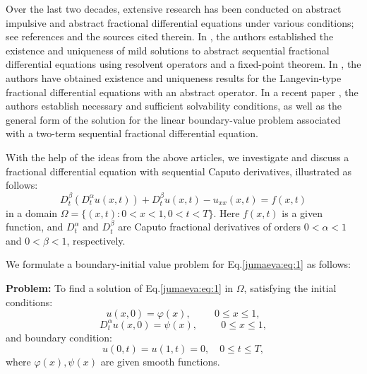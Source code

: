 \documentclass{amsart}
\numberwithin{equation}{section}
\begin{document}
Over the last two decades, extensive research has been conducted on abstract impulsive and abstract fractional differential equations under various conditions; see references \cite{jumaeva:ref:11, jumaeva:ref:12, jumaeva:ref:13, jumaeva:ref:14} and the sources cited therein.
In \cite{jumaeva:ref:11}, the authors established the existence and uniqueness of mild solutions to abstract sequential fractional differential equations using resolvent operators and a fixed-point theorem.
In \cite{jumaeva:ref:12, jumaeva:ref:13, jumaeva:ref:14}, the authors have obtained existence and uniqueness results for the Langevin-type fractional differential equations with an abstract operator.
In a recent paper \cite{jumaeva:ref:15}, the authors establish necessary and sufficient solvability conditions, as well as the general form of the solution for the linear boundary-value problem associated with a two-term sequential fractional differential equation.

With the help of the ideas from the above articles, we investigate and discuss a fractional differential equation with sequential Caputo derivatives, illustrated as follows:
\begin{equation}\label{jumaeva:eq:1} 
    D_t^\beta(D_t^\alpha u(x,t))+D_t^\beta u(x,t)-u_{xx}(x,t)=f(x,t) \end{equation}
in a domain $\Omega = \{(x, t) : 0 < x < 1, 0 < t <T\}$. Here $f(x, t)$ is a given function, and $D_t^\alpha$ and $D_t^\beta$  are Caputo fractional derivatives of orders $0<\alpha<1$ and $0<\beta<1$, respectively.

We formulate a boundary-initial value problem for Eq.\eqref{jumaeva:eq:1}  as follows:

\textbf{Problem:} To find a solution of Eq.\eqref{jumaeva:eq:1} in $\Omega$, satisfying the initial conditions:
\begin{equation}
   u(x,0)=\varphi(x), \hspace{1cm} 0\leq x \leq 1, \label{jumaeva:eq:2}
\end{equation}
\begin{equation}
     D_t^\alpha u(x,0)=\psi(x),\hspace{1cm} 0\leq x\leq 1, \label{jumaeva:eq:3}
\end{equation}
 and boundary condition:
 \begin{equation} 
     u(0,t)=u(1,t)=0 , \quad  0\leq t\leq T, \label{jumaeva:eq:4}
 \end{equation} 
 where $\varphi(x), \psi(x)$ are given smooth functions.
\end{document}

